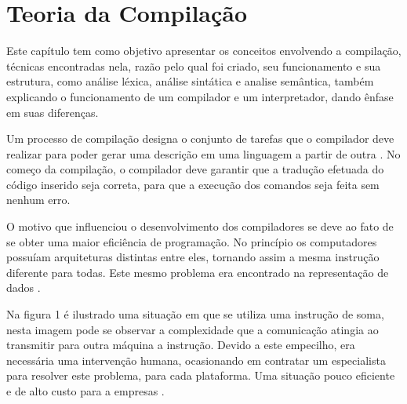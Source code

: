 \documentclass[12pt,oneside,a4paper,chapter=TITLE,section=TITLE,sumario=tradicional]{abntex2}
\begin{document}


\chapter{Teoria da Compilação}
\label{cap:teoria-da-compilação}

Este capítulo tem como objetivo apresentar os conceitos envolvendo a compilação, técnicas encontradas nela, razão pelo qual foi criado, seu funcionamento e sua estrutura, como análise léxica, análise sintática e analise semântica, também explicando o funcionamento de um compilador e um interpretador, dando ênfase em suas diferenças.

Um processo de compilação designa o conjunto de tarefas que o compilador deve realizar para poder gerar uma descrição em uma linguagem a partir de outra \cite{pedro2018}. No começo da compilação, o compilador deve garantir que a tradução efetuada do código inserido seja correta, para que a execução dos comandos seja feita sem nenhum erro.

O motivo que influenciou o desenvolvimento dos compiladores se deve ao fato de se obter uma maior eficiência de programação. No princípio os computadores possuíam arquiteturas distintas entre eles, tornando assim a mesma instrução diferente para todas. Este mesmo problema era encontrado na representação de dados \cite{ricarte2008}.

Na figura 1 é ilustrado uma situação em que se utiliza uma instrução de soma, nesta imagem pode se observar a complexidade que a comunicação atingia ao transmitir para outra máquina a instrução. Devido a este empecilho, era necessária uma intervenção humana, ocasionando em contratar um especialista para resolver este problema, para cada plataforma. Uma situação pouco eficiente e de alto custo para a empresas  \cite{ricarte2008}.
\end{document}
